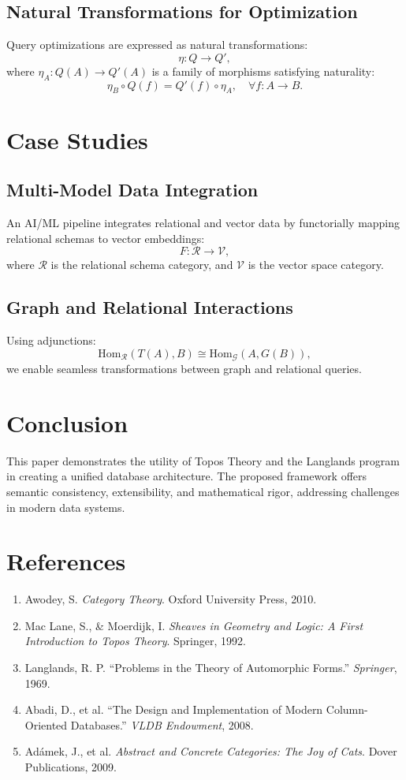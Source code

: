 \documentclass[12pt]{article}
\begin{document}
\subsection{Natural Transformations for Optimization}
Query optimizations are expressed as natural transformations:
\[
\eta: Q \to Q',
\]
where $\eta_A: Q(A) \to Q'(A)$ is a family of morphisms satisfying naturality:
\[
\eta_B \circ Q(f) = Q'(f) \circ \eta_A, \quad \forall f: A \to B.
\]

\section{Case Studies}

\subsection{Multi-Model Data Integration}
An AI/ML pipeline integrates relational and vector data by functorially mapping relational schemas to vector embeddings:
\[
F: \mathcal{R} \to \mathcal{V},
\]
where $\mathcal{R}$ is the relational schema category, and $\mathcal{V}$ is the vector space category.

\subsection{Graph and Relational Interactions}
Using adjunctions:
\[
\mathrm{Hom}_{\mathcal{R}}(T(A), B) \cong \mathrm{Hom}_{\mathcal{G}}(A, G(B)),
\]
we enable seamless transformations between graph and relational queries.

\section{Conclusion}

This paper demonstrates the utility of Topos Theory and the Langlands program in creating a unified database architecture. The proposed framework offers semantic consistency, extensibility, and mathematical rigor, addressing challenges in modern data systems.

\section*{References}
\begin{enumerate}
    \item Awodey, S. \emph{Category Theory}. Oxford University Press, 2010.
    \item Mac Lane, S., \& Moerdijk, I. \emph{Sheaves in Geometry and Logic: A First Introduction to Topos Theory}. Springer, 1992.
    \item Langlands, R. P. ``Problems in the Theory of Automorphic Forms.'' \emph{Springer}, 1969.
    \item Abadi, D., et al. ``The Design and Implementation of Modern Column-Oriented Databases.'' \emph{VLDB Endowment}, 2008.
    \item Adámek, J., et al. \emph{Abstract and Concrete Categories: The Joy of Cats}. Dover Publications, 2009.
\end{enumerate}
\end{document}
